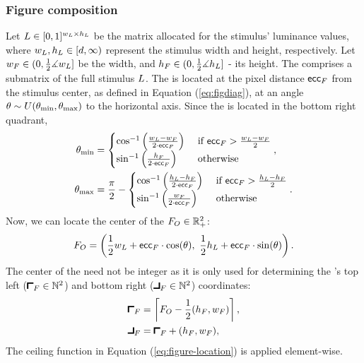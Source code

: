 \subsubsection{Figure composition}
\label{sec:figure-composition}

Let $L \in [0, 1]^{w_L \times h_L}$ be the matrix allocated for the stimulus' luminance values, where $w_L, h_L \in [d, \infty)$ represent the stimulus width and height, respectively.
Let ${w_F} \in (0, \frac{1}{2} \measuredangle w_L]$ be the \stimfig{} width, and ${h_F} \in (0, \frac{1}{2} \measuredangle h_L]$ - its height. The \stimfig{} comprises a submatrix of the full stimulus $L$. The \stimfig{} is located at the pixel distance $\mathsf{ecc}_F$ from the stimulus center, as defined in Equation (\ref{eq:figdiag}), at an angle $\theta \sim U(\theta_{\min}, \theta_{\max})$ to the horizontal axis. Since the \stimfig{} is located in the bottom right quadrant,
\begin{equation}
    \begin{aligned}
        \theta_{\min} &=
        \begin{cases}
            \cos^{-1} \left(
                \frac{w_L - {w_F}}{2 \cdot \mathsf{ecc}_F}
            \right)
            &\text{ if } \mathsf{ecc}_F > \frac{w_L - {w_F}}{2} \\
            \sin^{-1} \left( 
                \frac{{h_F}}{2 \cdot \mathsf{ecc}_F}
            \right)
            &\text{ otherwise}
        \end{cases}, \\
        \theta_{\max} &= \frac{\pi}{2} - 
        \begin{cases}
            \cos^{-1} \left(
                \frac{h_L - {h_F}}{2 \cdot \mathsf{ecc}_F}
            \right)
            &\text{ if } \mathsf{ecc}_F > \frac{h_L - {h_F}}{2} \\
            \sin^{-1} \left( 
                \frac{{w_F}}{2 \cdot \mathsf{ecc}_F}
            \right)
            &\text{ otherwise}
        \end{cases}.
    \end{aligned}
\end{equation}
Now, we can locate the center of the \stimfig{} $F_O \in \mathbb{R}_+^2$:
\begin{equation}
    F_O = \left(
        \frac{1}{2} w_L + \mathsf{ecc}_F \cdot \cos(\theta), \
        \frac{1}{2} h_L + \mathsf{ecc}_F \cdot \sin(\theta)
    \right).
\end{equation}
The center of the \stimfig{} need not be integer as it is only used for determining the \stimfig{}'s top left ($\figstart \in \mathbb{N}^2$) and bottom right ($\figfinish \in \mathbb{N}^2$) coordinates:
\begin{align}
\begin{split}
    \figstart &= \ceil{\figcenter - \frac{1}{2} (\figheight, \figwidth)}, \\
    \figfinish &= \figstart + (\figheight, \figwidth),
\end{split}
\label{eq:figure-location}
\end{align}
The ceiling function in Equation (\ref{eq:figure-location}) is applied element-wise.